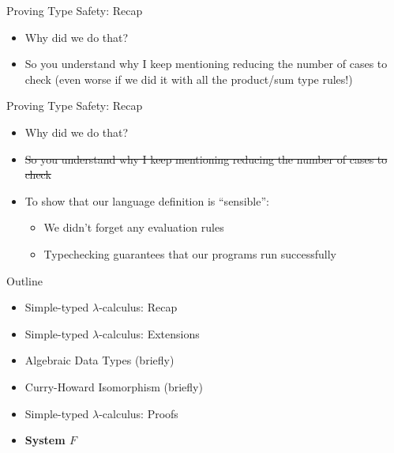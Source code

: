 \documentclass[leqno,presentation,usenames,dvipsnames]{beamer}
\begin{document}
\begin{frame}{Proving Type Safety: Recap}
    \begin{itemize}
        \item Why did we do that?
        \item So you understand why I keep mentioning reducing the number of cases to check (even worse if we did it with all the product/sum type rules!)
    \end{itemize}
\end{frame}

\begin{frame}{Proving Type Safety: Recap}
    \begin{itemize}
        \item Why did we do that?
        \item \st{So you understand why I keep mentioning reducing the number of cases to check}
        \item To show that our language definition is ``sensible'':
            \begin{itemize}
                \item We didn't forget any evaluation rules
                \item Typechecking guarantees that our programs run successfully
            \end{itemize}
    \end{itemize}
\end{frame}

\begin{frame}{Outline}
    \begin{itemize}
        \item Simple-typed $\lambda$-calculus: Recap
        \item Simple-typed $\lambda$-calculus: Extensions
        \item Algebraic Data Types (briefly)
        \item Curry-Howard Isomorphism (briefly)
        \item Simple-typed $\lambda$-calculus: Proofs
        \item \textbf{System $F$}
    \end{itemize}
\end{frame}
\end{document}
